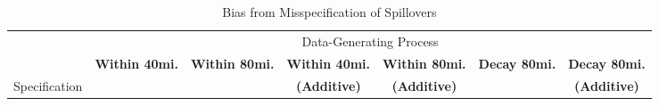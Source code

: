 \documentclass[aspectratio=169]{beamer}
\begin{document}

\begin{frame}

    \begin{table}[!tb]
        \caption{Bias from Misspecification of Spillovers}
        \label{tab:misspecification}
    
        \begin{adjustbox}{width = 1.1\textwidth, center}
            \begin{threeparttable}
                \begin{tabular}{@{} l rrrrrr @{}}
                    \toprule
                    & \multicolumn{6}{c}{Data-Generating Process} \\
                    \cmidrule{2-7}
    
                    & \multicolumn{1}{c}{\textbf{Within 40mi.}} & \multicolumn{1}{c}{\textbf{Within 80mi.}} & \multicolumn{1}{c}{\textbf{Within 40mi.}} & \multicolumn{1}{c}{\textbf{Within 80mi.}} & \multicolumn{1}{c}{\textbf{Decay 80mi.}} & \multicolumn{1}{c}{\textbf{Decay 80mi.}} \\
                    Specification & & & \multicolumn{1}{c}{\textbf{(Additive)}} & \multicolumn{1}{c}{\textbf{(Additive)}} & & \multicolumn{1}{c}{\textbf{(Additive)}} \\
    
     
                    \midrule
                    

\end{tabular}
\end{threeparttable}
\end{adjustbox}
\end{table}
\end{frame}
\end{document}
